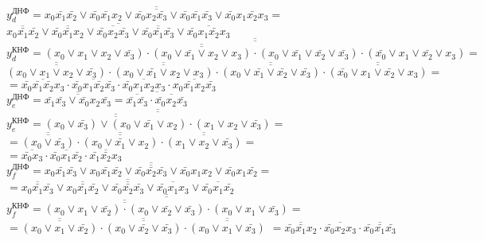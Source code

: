 \documentclass{bmstu}
\begin{document}
	$y^{\text{ДНФ}}_d = \overline{\overline{
	x_0 \bar{x_1} \bar{x_2} \vee
	\bar{x_0} \bar{x_1} x_2 \vee
	\bar{x_0} x_2 \bar{x_3} \vee
	\bar{x_0} \bar{x_1} \bar{x_3} \vee
	\bar{x_0} x_1 \bar{x_2} x_3
	}} =$ \\
	$\overline{
	\overline{x_0 \bar{x_1} \bar{x_2}} \vee
	\overline{\bar{x_0} \bar{x_1} x_2} \vee
	\overline{\bar{x_0} x_2 \bar{x_3}} \vee
	\overline{\bar{x_0} \bar{x_1} \bar{x_3}} \vee
	\overline{\bar{x_0} x_1 \bar{x_2} x_3}
	}$ \\
	$y^{\text{КНФ}}_d = \overline{\overline{
	\overline{\overline{
	(x_0 \vee x_1 \vee x_2 \vee \bar{x_3}) \cdot
	(x_0 \vee \bar{x_1} \vee x_2 \vee x_3) \cdot
	(x_0 \vee \bar{x_1} \vee \bar{x_2} \vee \bar{x_3})
	}} \cdot (\bar{x_0} \vee x_1 \vee \bar{x_2} \vee x_3)
	}} =$ \\
	$\overline{\overline{(x_0 \vee x_1 \vee x_2 \vee \bar{x_3})}} \cdot
	\overline{\overline{(x_0 \vee \bar{x_1} \vee x_2 \vee x_3)}} \cdot
	\overline{\overline{(x_0 \vee \bar{x_1} \vee \bar{x_2} \vee \bar{x_3})}} \cdot
	\overline{\overline{(\bar{x_0} \vee x_1 \vee \bar{x_2} \vee x_3)}} =$ \\
	$= \overline{\bar{x_0} \bar{x_1} \bar{x_2} x_3} \cdot
	\overline{\bar{x_0} x_1 \bar{x_2} \bar{x_3}} \cdot
	\overline{\bar{x_0} x_1 x_2 x_3} \cdot
	\overline{x_0 \bar{x_1} x_2 \bar{x_3}}$ \\


	$y^{\text{ДНФ}}_e = \overline{\overline{
	\bar{x_1} \bar{x_3} \vee
	\bar{x_0} x_2 \bar{x_3}
	}} = \overline{
	\overline{\bar{x_1} \bar{x_3}} \cdot \overline{\bar{x_0} x_2 \bar{x_3}}
	}$ \\
	$y^{\text{КНФ}}_e = \overline{\overline{
	\overline{\overline{
	(x_0 \vee \bar{x_3}) \vee
	(x_0 \vee \bar{x_1} \vee x_2)
	}} \cdot
	(x_1 \vee x_2 \vee \bar{x_3})
	}} =$ \\
	$= \overline{\overline{(x_0 \vee \bar{x_3})}} \cdot
	\overline{\overline{(x_0 \vee \bar{x_1} \vee x_2)}} \cdot
	\overline{\overline{(x_1 \vee x_2 \vee \bar{x_3})}} =$ \\
	$= \overline{\bar{x_0} x_3} \cdot
	\overline{\bar{x_0} x_1 \bar{x_2}} \cdot
	\overline{\bar{x_1} \bar{x_2} x_3}$ \\


	$y^{\text{ДНФ}}_f = \overline{\overline{x_0 \bar{x_1} \bar{x_3} \vee x_0 \bar{x_1} \bar{x_2} \vee \bar{x_0} \bar{x_2} \bar{x_3} \vee \bar{x_0} x_1 x_2 \vee \bar{x_0} x_1 \bar{x_2}}} =$ \\
	$= \overline{\overline{x_0 \bar{x_1} \bar{x_3}} \vee \overline{x_0 \bar{x_1} \bar{x_2}} \vee \overline{\bar{x_0} \bar{x_2} \bar{x_3}} \vee \overline{\bar{x_0} x_1 x_3} \vee \overline{\bar{x_0} x_1 \bar{x_2}}}$ \\
	$y^{\text{КНФ}}_f = \overline{\overline{\overline{\overline{(x_0 \vee x_1 \vee \bar{x_2}) \cdot(x_0 \vee \bar{x_2} \vee \bar{x_3})}} \cdot (x_0 \vee x_1 \vee \bar{x_3})}} =$ \\
	$= \overline{\overline{(x_0 \vee x_1 \vee \bar{x_2})}} \cdot \overline{\overline{(x_0 \vee \bar{x_2} \vee \bar{x_3})}} \cdot \overline{\overline{(x_0 \vee x_1 \vee \bar{x_3})}}$
	$= \overline{\bar{x_0} \bar{x_1} x_2} \cdot \overline{\bar{x_0} x_2 x_3} \cdot \overline{\bar{x_0} \bar{x_1} \bar{x_3}}$ \\
\end{document}

